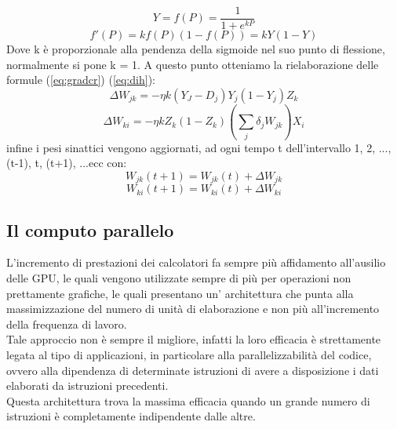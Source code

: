 \documentclass[10pt,a4paper]{article}
\begin{document}
\begin{equation}
Y = f(P) = \frac{1}{1+e^{kP}}
\end{equation}
\begin{equation}
f'(P) = kf(P)(1-f(P)) = kY(1-Y)
\end{equation}
Dove k è proporzionale alla pendenza della sigmoide nel suo punto di flessione, normalmente si pone k = 1.
A questo punto otteniamo la rielaborazione delle formule (\ref{eq:gradcr}) (\ref{eq:dih}):
\begin{equation}
\Delta W_{jk} = -\eta k (Y_J - D_j)Y_j(1-Y_j)Z_k
\end{equation} 
\begin{equation}
\Delta W_{ki} = -\eta k Z_k (1-Z_k)(\sum_j \delta_j W_{jk})X_i
\end{equation} 
infine i pesi sinattici vengono aggiornati, ad ogni tempo t dell'intervallo 1, 2, ..., (t-1), t, (t+1), ...ecc con:
\begin{equation}
W_{jk}(t+1) = W_{jk}(t) + \Delta W_{jk}
\end{equation}
\begin{equation}
W_{ki}(t+1) = W_{ki}(t) + \Delta W_{ki}
\end{equation} 

\subsection{Il computo parallelo}
L'incremento di prestazioni dei calcolatori fa sempre più affidamento all'ausilio delle GPU, le quali vengono utilizzate sempre di più per operazioni non prettamente grafiche, le quali presentano un' architettura che punta alla massimizzazione del numero di unità di elaborazione e non più all'incremento della frequenza di lavoro.\\
Tale approccio non è sempre il migliore, infatti la loro efficacia è strettamente legata al tipo di applicazioni, in particolare alla parallelizzabilità del codice, ovvero alla dipendenza di determinate istruzioni di avere a disposizione i dati elaborati da istruzioni precedenti.\\
Questa architettura trova la massima efficacia quando un grande numero di istruzioni è completamente indipendente dalle altre. 
\end{document}
